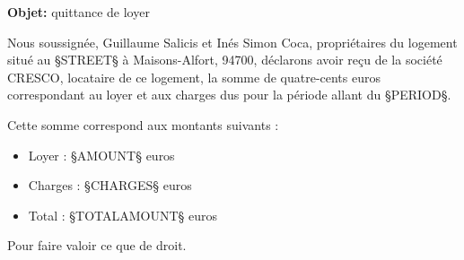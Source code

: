 \documentclass[11pt]{letter}
\date{§DATE§}
\begin{document}
\begin{letter}{}
\opening{\textbf{Objet:} quittance de loyer}

\vspace{5mm}
\hspace{5mm} Nous soussignée, Guillaume Salicis et Inés Simon Coca, propriétaires du logement situé au §STREET§ à Maisons-Alfort, 94700, déclarons avoir reçu de la société CRESCO, locataire de ce logement, la somme de quatre-cents euros correspondant au loyer et aux charges dus pour la période allant du §PERIOD§.

\vspace{5mm}
Cette somme correspond aux montants suivants :
\begin{itemize}
\item Loyer : §AMOUNT§ euros
\item Charges : §CHARGES§ euros
\item Total : §TOTALAMOUNT§ euros
\end{itemize}

\closing{Pour faire valoir ce que de droit.}
\end{letter}
\end{document}
